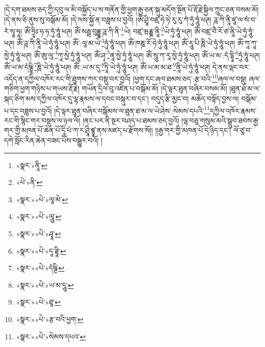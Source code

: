 །དེ་དག་ཐམས་ཅད་ཀྱི་དབུ་ལ་མི་བསྐྱོད་པ་ས་གནོན་གྱི་ཕྱག་རྒྱ་ཅན་སྐུ་མདོག་སྔོན་པོ་རྡོ་རྗེ་སྐྱིལ་ཀྲུང་ཅན་བསམ་མོ། །དེ་ནས་ཅི་ནུས་སུ་བསྒོམ་མོ། །དེ་ལས་སྐྱོ་ན་བཟླས་པ་བྱའོ། །ཨོཾ་ཤྲཱི་བཛྲ་ཧེ་ཧེ་རུ་རུ་ཀཾ་ཧུཾ་ཧཱུཾ་ཕཊ། ཌཱ་ཀི་ནཱི་ཛཱ་ལ་སཾ་བ་རཾ་སྭཱ་ཧཱ། ཨོཾ་ཧྲཱིཿ་ཧ་ཧ་ཧུཾ་ཧཱུཾ་ཕཊ། ཨོཾ་སརྦྦ་བུདྡྷ་ཌཱ་ཀི་ནི་\footnote{«སྣར་»ནཱི་}ཡེ། བཛྲ་ཝརྞྞ་ནཱི་\footnote{«པེ་»ནི་}ཡེ་ཧུཾ་ཧཱུཾ་ཕཊ། ཨོཾ་བཛྲ་བཻ་རོ་ཙ་ནཱི་ཡེ་ཧུཾ་ཧཱུཾ་ཕཊ། ཨོཾ་ཌཱ་ཀི་ནཱི་ཡེ་ཧུཾ་ཧཱུཾ་ཕཊ། ཨོཾ་:ལཱ་མ་ཡེ་\footnote{«སྣར་»«པེ་»ལཱ་མེ་}ཧུཾ་ཧཱུཾ་ཕཊ། ཨོཾ་ཁཎྜ་རོ་ཧེ་ཧུཾ་ཧཱུཾ་ཕཊ། ཨོཾ་རཱུ་པི་ཎཱི་ཡེ་ཧུཾ་ཧཱུཾ་ཕཊ། ཨོཾ་ཀཱ་ཀཱ་སྱེ་ཧུཾ་ཧཱུཾ་ཕཊ། ཨོཾ་ཨུ་ལུ་\footnote{«སྣར་»«པེ་»ལཱུ་}ཀཱ་སྱེ་ཧུཾ་ཧཱུཾ་ཕཊ། ཨོཾ་ཤྭ་\footnote{«སྣར་»«པེ་»ཤྭཱ་}ནཱ་སྱེ་ཧུཾ་ཧཱུཾ་ཕཊ། ཨོཾ་སཱུ་ཀ་རཱ་སྱེ་ཧུཾ་ཧཱུཾ་ཕཊ། ཨོཾ་ཡ་མ་:དཾ་དྷཱི་\footnote{«སྣར་»«པེ་»དཱ་ཌྷཱི་}ཧུཾ་ཧཱུཾ་ཕཊ། ཨོཾ་ཡ་མ་དཾཥྚྲཱི་\footnote{«སྣར་»«པེ་»དཾཥྚྲི་}ཎཱི་ཡེ་ཧུཾ་ཧཱུཾ་ཕཊ། ཨོཾ་:ཡ་མ་དུ་\footnote{«སྣར་»«པེ་»ཡ་མ་དཱུ་}ཏཱི་ཡེ་ཧུཾ་ཧཱུཾ་ཕཊ། ཨོཾ་ཡ་མ་མ་ཐ་\footnote{«སྣར་»«པེ་»ཐཱ་}ནཱི་ཡེ་ཧུཾ་ཧཱུཾ་ཕཊ། དེ་ནས་ལྡང་བར་འདོད་ན་དཀྱིལ་འཁོར་རང་གི་ཐུགས་ཀར་བསྡུ་བར་བྱའོ། །ཕྱག་དང་ཞལ་ཐམས་ཅད་:རྩ་བའི་\footnote{«སྣར་»«པེ་»རྩ་བའི་ཕྱག་}ཞལ་ལ་བསྡུ། ཞལ་གཅིག་ཕྱག་གཉིས་པ་གཡས་རྡོ་རྗེ། གཡོན་དྲིལ་བུ་འཛིན་པ་བསྒོམ་མོ། །དེ་ལྟར་ཐུན་བཞིར་བསམ་མོ། །ཐུན་ཐ་མ་ལ་སྐད་ཅིག་མས་དཀྱིལ་འཁོར་དུ་ལྷ་རྣམས་ལ་དབང་བསྐུར་བ་དང་། བདུད་རྩི་མྱང་བ། མཆོད་བསྟོད་བྱས་ལ། བསྒོམ་པ་དང་བཟླས་པ་བྱའོ། །དེ་ལྟར་ཐུན་བཞིར་བསྒོམས་ལ་ཐུན་ཐ་མ་ལ་ཡེ་ཤེས་:སེམས་དཔའི་\footnote{«སྣར་»«པེ་»སེམས་དཔའ་}དཀྱིལ་འཁོར་རྣམས་རང་གི་སྙིང་གར་བསྡུས་ལ་ཉལ་ལོ། །ནང་པར་ནི་སྔར་བཤད་པ་ཐམས་ཅད་བྱའོ། །ལྷ་བཅུ་གསུམ་མའི་སྒྲུབ་ཐབས་རྒྱ་གར་གྱི་མཁན་པོ་ཆེན་པོ་དཱི་པཾ་ཀ་ར་ཤྲཱི་ཛྙཱ་ནས་མཛད་པ་རྫོགས་སོ།། །།རྒྱ་གར་གྱི་མཁན་པོ་དེ་ཉིད་དང་། ལོ་ཙཱ་བ་དགེ་སློང་རིན་ཆེན་བཟང་པོས་བསྒྱུར་བའོ། ། 